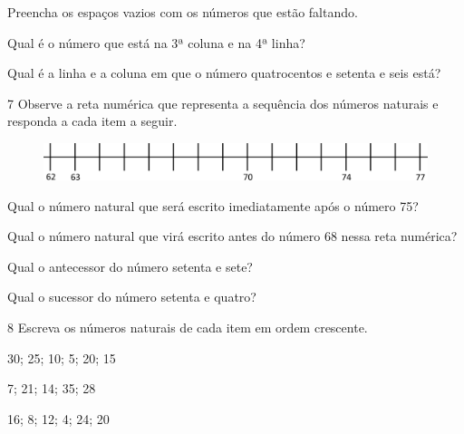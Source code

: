 \begin{escolha}
\item Preencha os espaços vazios com os números que estão faltando.

\item Qual é o número que está na 3ª coluna e na 4ª linha?

\item Qual é a linha e a coluna em que o número quatrocentos e setenta e seis está?
\end{escolha}

\vspace{-2ex}

\num{7} Observe a reta numérica que representa a sequência dos números naturais e responda a cada item a seguir.

\begin{figure}[htpb!]
\includegraphics[width=\textwidth]{./media/image31.png}
\end{figure}

\begin{escolha}
\item Qual o número natural que será escrito imediatamente após o número 75?

\item Qual o número natural que virá escrito antes do número 68 nessa reta numérica?

\item Qual o antecessor do número setenta e sete?

\item Qual o sucessor do número setenta e quatro?
\end{escolha}

\num{8} Escreva os números naturais de cada item em ordem crescente.

\begin{escolha}
\item 30; 25; 10; 5; 20; 15

\item 7; 21; 14; 35; 28

\item 16; 8; 12; 4; 24; 20
\end{escolha}

